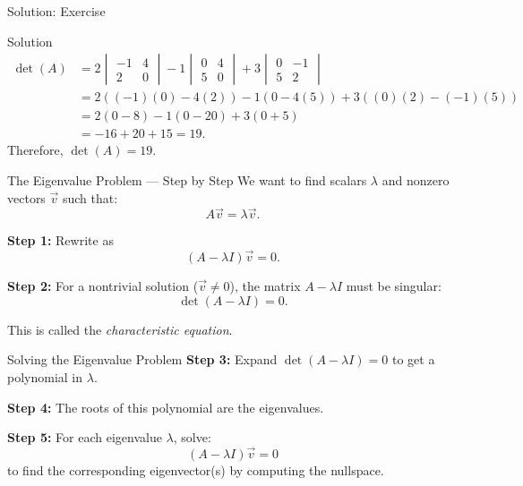 \documentclass{beamer}
\begin{document}
\begin{frame}{Solution: Exercise}
\begin{block}{Solution}
\begin{align}
\det(A) &=
2 
\begin{vmatrix} 
-1 & 4 \\ 2 & 0 
\end{vmatrix}
- 1 
\begin{vmatrix} 
0 & 4 \\ 5 & 0 
\end{vmatrix}
+ 3 
\begin{vmatrix} 
0 & -1 \\ 5 & 2 
\end{vmatrix} \\
&= 2((-1)(0) -4(2)) -1(0 -4(5)) +3((0)(2) -(-1)(5)) \\
&= 2(0-8) -1(0-20) +3(0+5) \\
&= -16 +20 +15 = 19.
\end{align}
Therefore, \(\det(A) = 19.\)
\end{block}
\end{frame}

\begin{frame}{The Eigenvalue Problem — Step by Step}
We want to find scalars \(\lambda\) and nonzero vectors \(\vec{v}\) such that:
\begin{equation}
A \vec{v} = \lambda \vec{v}.
\end{equation}

\textbf{Step 1:} Rewrite as
\begin{equation}
(A - \lambda I)\vec{v} = 0.
\end{equation}

\textbf{Step 2:} For a nontrivial solution (\(\vec{v} \neq 0\)), the matrix \(A - \lambda I\) must be singular:
\begin{equation}
\det(A - \lambda I) = 0.
\end{equation}

This is called the \emph{characteristic equation}.
\end{frame}

\begin{frame}{Solving the Eigenvalue Problem}
\textbf{Step 3:} Expand \(\det(A - \lambda I) = 0\) to get a polynomial in \(\lambda\).

\textbf{Step 4:} The roots of this polynomial are the eigenvalues.

\textbf{Step 5:} For each eigenvalue \(\lambda\), solve:
\begin{equation}
(A - \lambda I)\vec{v} = 0
\end{equation}
to find the corresponding eigenvector(s) by computing the nullspace.
\end{frame}
\end{document}
